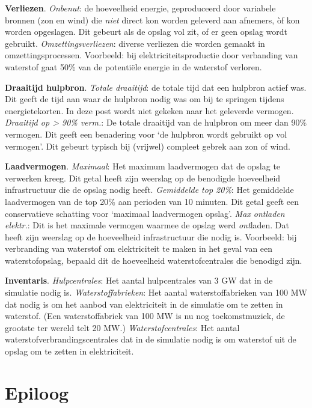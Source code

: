 \documentclass[
  11pt,
  a4paper,
]{book}
\begin{document}
\noindent 
\textbf{Verliezen}. \emph{Onbenut}: de hoeveelheid energie, geproduceerd door variabele bronnen (zon en wind) die \emph{niet} direct kon worden geleverd aan afnemers, òf kon worden opgeslagen. Dit gebeurt als de opslag vol zit, of er geen opslag wordt gebruikt. \emph{Omzettingsverliezen}: diverse verliezen die worden gemaakt in omzettingsprocessen. Voorbeeld: bij elektriciteitsproductie door verbanding van waterstof gaat 50\% van de potentiële energie in de waterstof verloren.

\noindent 
\textbf{Draaitijd hulpbron}. \emph{Totale draaitijd}: de totale tijd dat een hulpbron actief was. Dit geeft de tijd aan waar de hulpbron nodig was om bij te springen tijdens energietekorten. In deze post wordt niet gekeken naar het geleverde vermogen. \emph{Draaitijd op \textgreater{} 90\% verm.}: De totale draaitijd van de hulpbron om meer dan 90\% vermogen. Dit geeft een benadering voor `de hulpbron wordt gebruikt op vol vermogen'. Dit gebeurt typisch bij (vrijwel) compleet gebrek aan zon of wind.

\noindent 
\textbf{Laadvermogen}. \emph{Maximaal}: Het maximum laadvermogen dat de opslag te verwerken kreeg. Dit getal heeft zijn weerslag op de benodigde hoeveelheid infrastructuur die de opslag nodig heeft. \emph{Gemiddelde top 20\%}: Het gemiddelde laadvermogen van de top 20\% aan perioden van 10 minuten. Dit getal geeft een conservatieve schatting voor `maximaal laadvermogen opslag'. \emph{Max ontladen elektr.}: Dit is het maximale vermogen waarmee de opslag werd \emph{ont}laden. Dat heeft zijn weerslag op de hoeveelheid infrastructuur die nodig is. Voorbeeld: bij verbranding van waterstof om elektriciteit te maken in het geval van een waterstofopslag, bepaald dit de hoeveelheid waterstofcentrales die benodigd zijn.

\noindent 
\textbf{Inventaris}. \emph{Hulpcentrales}: Het aantal hulpcentrales van 3 GW dat in de simulatie nodig is. \emph{Waterstoffabrieken}: Het aantal waterstoffabrieken van 100 MW dat nodig is om het aanbod van elektriciteit in de simulatie om te zetten in waterstof. (Een waterstoffabriek van 100 MW is nu nog toekomstmuziek, de grootste ter wereld telt 20 MW.) \emph{Waterstofcentrales}: Het aantal waterstofverbrandingscentrales dat in de simulatie nodig is om waterstof uit de opslag om te zetten in elektriciteit.

\normalsize

\hypertarget{epiloog}{%
\chapter*{Epiloog}\label{epiloog}}
\end{document}
